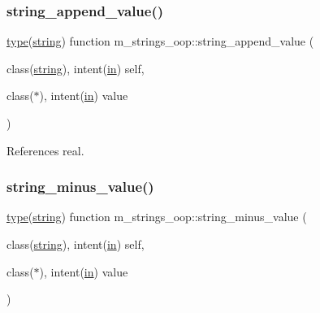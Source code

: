 \subsubsection{\texorpdfstring{string\+\_\+append\+\_\+value()}{string\_append\_value()}}
{\footnotesize\ttfamily \hyperlink{stop__watch_83_8txt_a70f0ead91c32e25323c03265aa302c1c}{type}(\hyperlink{structm__strings__oop_1_1string}{string}) function m\+\_\+strings\+\_\+oop\+::string\+\_\+append\+\_\+value (\begin{DoxyParamCaption}\item[{class(\hyperlink{structm__strings__oop_1_1string}{string}), intent(\hyperlink{M__journal_83_8txt_afce72651d1eed785a2132bee863b2f38}{in})}]{self,  }\item[{class($\ast$), intent(\hyperlink{M__journal_83_8txt_afce72651d1eed785a2132bee863b2f38}{in})}]{value }\end{DoxyParamCaption})\hspace{0.3cm}{\ttfamily [private]}}



References real.

\mbox{\label{namespacem__strings__oop_a0ec84db43ac789bfc02f46f933a3fc9f}} 
\subsubsection{\texorpdfstring{string\+\_\+minus\+\_\+value()}{string\_minus\_value()}}
{\footnotesize\ttfamily \hyperlink{stop__watch_83_8txt_a70f0ead91c32e25323c03265aa302c1c}{type}(\hyperlink{structm__strings__oop_1_1string}{string}) function m\+\_\+strings\+\_\+oop\+::string\+\_\+minus\+\_\+value (\begin{DoxyParamCaption}\item[{class(\hyperlink{structm__strings__oop_1_1string}{string}), intent(\hyperlink{M__journal_83_8txt_afce72651d1eed785a2132bee863b2f38}{in})}]{self,  }\item[{class($\ast$), intent(\hyperlink{M__journal_83_8txt_afce72651d1eed785a2132bee863b2f38}{in})}]{value }\end{DoxyParamCaption})\hspace{0.3cm}{\ttfamily [private]}}



